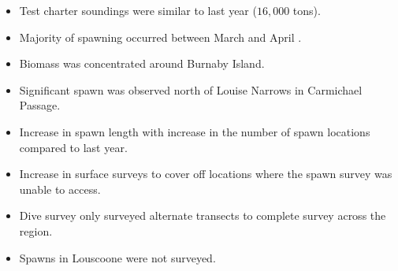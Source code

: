 \begin{itemize}
\item Test charter soundings were similar to last year ($16,000$ tons).
\item Majority of spawning occurred between March  and April .
\item Biomass was concentrated around Burnaby Island.
\item Significant spawn was observed north of Louise Narrows in Carmichael Passage.
\item Increase in spawn length with increase in the number of spawn locations compared to last year.
\item Increase in surface surveys to cover off locations where the spawn survey was unable to access.
\item Dive survey only surveyed alternate transects to complete survey across the region.
\item Spawns in Louscoone were not surveyed.
\end{itemize}